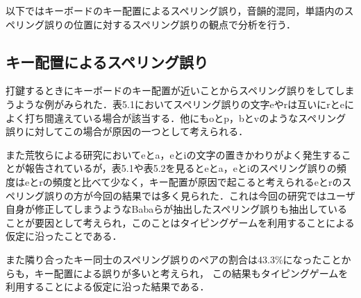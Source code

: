 以下ではキーボードのキー配置によるスペリング誤り，音韻的混同，単語内のスペリング誤りの位置に対するスペリング誤りの観点で分析を行う．

\subsection{キー配置によるスペリング誤り}
打鍵するときにキーボードのキー配置が近いことからスペリング誤りをしてしまうような例がみられた．表5.1においてスペリング誤りの文字eやrは互いにrとeによく打ち間違えている場合が該当する．他にもoとp，bとvのようなスペリング誤りに対してこの場合が原因の一つとして考えられる．

また荒牧らによる研究\cite{aramakiNLP2010}においてeとa，eとiの文字の置きかわりがよく発生することが報告されているが，表5.1や表5.2を見るとeとa，eとiのスペリング誤りの頻度はeとrの頻度と比べて少なく，キー配置が原因で起こると考えられるeとrのスペリング誤りの方が今回の結果では多く見られた．これは今回の研究ではユーザ自身が修正してしまうようなBabaらが抽出したスペリング誤り\cite{babaACL2012}も抽出していることが要因として考えられ，このことはタイピングゲームを利用することによる仮定に沿ったことである．

\begin{comment}
表5.1においてのスペリング誤りの文字と入力すべき文字をスペリング誤りのペアとして抽出し，その中で
\end{comment}
また隣り合ったキー同士のスペリング誤りのペアの割合は43.3\%になったことからも，キー配置による誤りが多いと考えられ，
この結果もタイピングゲームを利用することによる仮定に沿った結果である．

\begin{comment}
\subsubsection{視覚的混同}
文字同士の形が似ていることから視覚的混同を起こすことが原因であると考えられるスペリング誤りを示す．文字同士の形態的類似度は荒牧ら\cite{aramakiNLP2010}が用いた式に基づいて算出した．式は文字をMSゴシックのフォントで表し，2つの文字の面積の和を分母，2つの文字のフォントを重ね合わせたとき，重なり合った部分の面積の2倍の値を分子としている．式は以下に示す．

\[
  \mbox{文字の類似度} = \frac{\mbox{文字同士の重なり合う部分の面積} \times 2}{\mbox{2つの文字の面積の和}}
\]

表5.3にこの式を用いて求めたsやoと他の文字との類似度を示す．表5.1をみるとsがスペリング誤りになるときの入力すべき文字はcであり，これらの文字は表5.3で示される文字の類似度においても高い値を示している．また表5.3にはpとoについての類似度も示しており，pとoの類似度が互いに高い類似度の値を示している．このことからcとs，pとoのスペリング誤りにおいて視覚的混同が理由の一つになると考えられる．

表5.1においてのスペリング誤りの文字と入力すべき文字をスペリング誤りのペアとして抽出し，その中で表5.3の類似度が0.75以上となるスペリング誤りを抽出したところ，その割合は18.2\%となった．
\end{comment}

